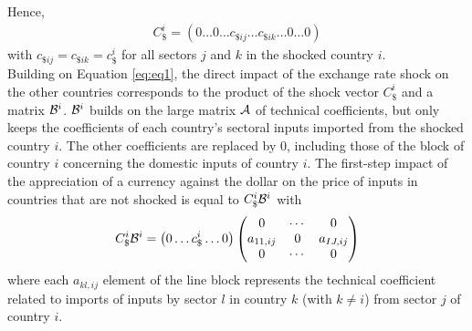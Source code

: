 \documentclass[11pt,a4paper]{article}
\begin{document}
Hence,
\begin{eqnarray*}
C_\$^i=\left(0\ldots0\ldots c_{\$ij}\ldots c_{\$ik}\dots 0\ldots0\right)
\end{eqnarray*}
with $c_{\$ij}=c_{\$ik}=c_\$^i
$
for all sectors $j$ and $k$ in the shocked country $i$.\\
Building on Equation \ref{eq:eq1}, the direct impact of the exchange rate shock on the other countries corresponds to the product of the shock vector $C_\$^i$ and a matrix ${\cal B}^i$. 
${\cal B}^i$ builds on the large matrix ${\cal A}$ of technical coefficients, but only keeps the coefficients of each country's sectoral inputs imported from the shocked country $i$. The other coefficients are replaced by 0, including those of the block of country $i$ concerning the domestic inputs of country $i$. 
The first-step impact of the appreciation of a currency against the dollar on the price of inputs in countries that are not shocked is equal to $C_\$^i{\cal B}^i$ with
\begin{eqnarray}
C_\$^i{\cal B}^i=\left(0\ldots c_\$^i \ldots 0\right)\left(\begin{matrix}0&\cdots&0\\a_{11,ij}&0&a_{IJ,ij}\\0&\cdots&0\\\end{matrix}\right) 	
\label{eq:eq3}
\end{eqnarray}
where each $a_{kl,ij}$ element of the line block represents the technical coefficient related to imports of inputs by sector $l$ in country $k$ (with $k\ne i$) from sector $j$ of country $i$.\\
\end{document}
